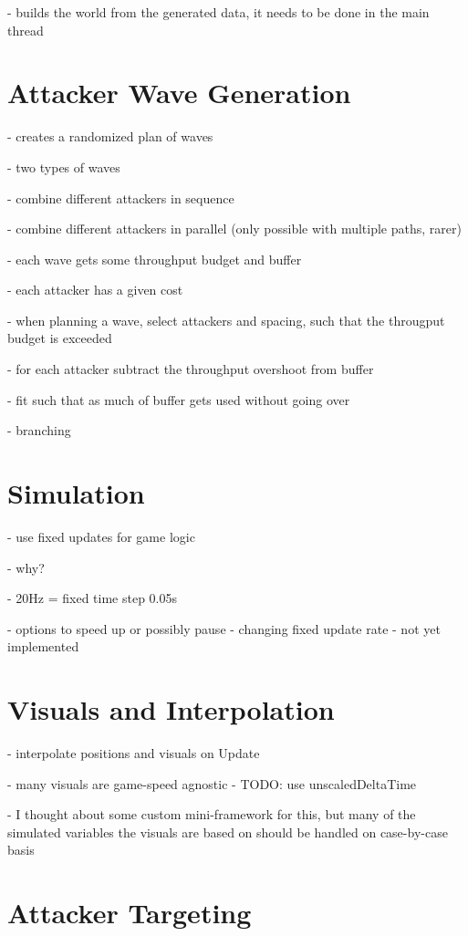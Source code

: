 - builds the world from the generated data, it needs to be done in the main thread

\section{Attacker Wave Generation}

- creates a randomized plan of waves

- two types of waves

- combine different attackers in sequence

- combine different attackers in parallel (only possible with multiple paths, rarer)

- each wave gets some throughput budget and buffer

- each attacker has a given cost

- when planning a wave, select attackers and spacing, such that the througput budget is exceeded

- for each attacker subtract the throughput overshoot from buffer

- fit such that as much of buffer gets used without going over

- branching

\section{Simulation}

- use fixed updates for game logic

- why?

- 20Hz = fixed time step 0.05s

- options to speed up or possibly pause - changing fixed update rate - not yet implemented

\section{Visuals and Interpolation}

- interpolate positions and visuals on Update

- many visuals are game-speed agnostic     - TODO: use unscaledDeltaTime

- I thought about some custom mini-framework for this, but many of the simulated variables the visuals are based on should be handled on case-by-case basis

\section{Attacker Targeting}

